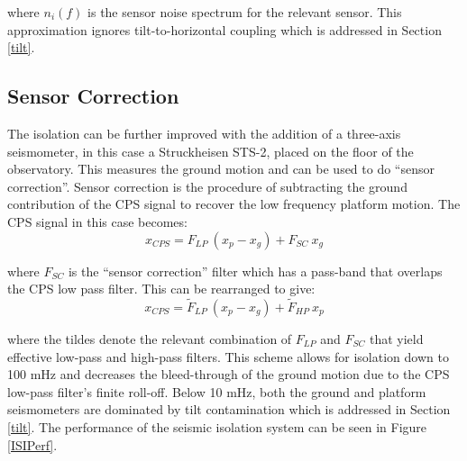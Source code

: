 \documentclass [12pt, proquest]{uwthesis}[2019]
\begin{document}
where $n_{i}(f)$ is the sensor noise spectrum for the relevant sensor. This approximation ignores tilt-to-horizontal coupling which is addressed in Section \ref{tilt}.

\subsection{Sensor Correction}\label{SensCor}

The isolation can be further improved with the addition of a three-axis seismometer, in this case a Struckheisen STS-2, placed on the floor of the observatory. This measures the ground motion and can be used to do ``sensor correction''. Sensor correction is the procedure of subtracting the ground contribution of the CPS signal to recover the low frequency platform motion. The CPS signal in this case becomes:
\begin{equation}
x_{CPS}=F_{LP}\ (x_p-x_g)+F_{SC}\ x_g
\end{equation}

where $F_{SC}$ is the ``sensor correction'' filter which has a pass-band that overlaps the CPS low pass filter. This can be rearranged to give:
\begin{equation}
x_{CPS}=\tilde F_{LP}\ (x_p-x_g)+\tilde F_{HP}\ x_p
\end{equation}

where the tildes denote the relevant combination of $F_{LP}$ and $F_{SC}$ that yield effective low-pass and high-pass filters. This scheme allows for isolation down to 100 mHz and decreases the bleed-through of the  ground motion due to the CPS low-pass filter's finite roll-off. Below 10 mHz, both the ground and platform seismometers are dominated by tilt contamination which is addressed in Section \ref{tilt}. The performance of the seismic isolation system can be seen in Figure \ref{ISIPerf}.
\end{document}
